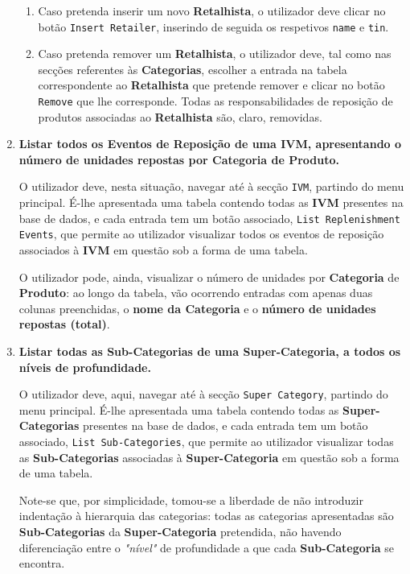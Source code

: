 \documentclass[12pt,a4paper]{article}
\begin{document}
\begin{enumerate}
    \begin{enumerate}
      \item Caso pretenda inserir um novo \textbf{Retalhista}, o utilizador
      deve clicar no botão \texttt{Insert Retailer}, inserindo de seguida os respetivos
      \texttt{name} e \texttt{tin}.

      \item Caso pretenda remover um \textbf{Retalhista}, o utilizador deve, tal
      como nas secções referentes às \textbf{Categorias}, escolher a entrada na
      tabela correspondente ao \textbf{Retalhista} que pretende remover e clicar
      no botão \texttt{Remove} que lhe corresponde. Todas as responsabilidades
      de reposição de produtos associadas ao \textbf{Retalhista} são, claro, removidas.
    \end{enumerate}
    
    \item \textbf{Listar todos os Eventos de Reposição de uma IVM, apresentando
    o número de unidades repostas por Categoria de Produto.}

    O utilizador deve, nesta situação, navegar até à secção \texttt{IVM},
    partindo do menu principal. É-lhe apresentada uma tabela contendo todas as
    \textbf{IVM} presentes na base de dados, e cada entrada tem um botão
    associado, \texttt{List Replenishment Events}, que permite ao utilizador
    visualizar todos os eventos de reposição associados à \textbf{IVM} em questão
    sob a forma de uma tabela.
    
    O utilizador pode, ainda, visualizar o número
    de unidades por \textbf{Categoria} de \textbf{Produto}: ao longo da tabela,
    vão ocorrendo entradas com apenas duas colunas preenchidas, o \textbf{nome
    da Categoria} e o \textbf{número de unidades repostas (total)}.
    
    \item \textbf{Listar todas as Sub-Categorias de uma Super-Categoria, a todos
    os níveis de profundidade.}

    O utilizador deve, aqui, navegar até à secção \texttt{Super Category},
    partindo do menu principal. É-lhe apresentada uma tabela contendo todas as
    \textbf{Super-Categorias} presentes na base de dados, e cada entrada tem um
    botão associado, \texttt{List Sub-Categories}, que permite ao utilizador
    visualizar todas as \textbf{Sub-Categorias} associadas à \textbf{Super-Categoria}
    em questão sob a forma de uma tabela.
    
    Note-se que, por simplicidade, tomou-se a liberdade de não introduzir indentação
    à hierarquia das categorias: todas as categorias apresentadas são
    \textbf{Sub-Categorias} da \textbf{Super-Categoria} pretendida, não havendo diferenciação
    entre o \textit{"nível"} de profundidade a que cada \textbf{Sub-Categoria} se encontra.

  \end{enumerate}
\end{document}
